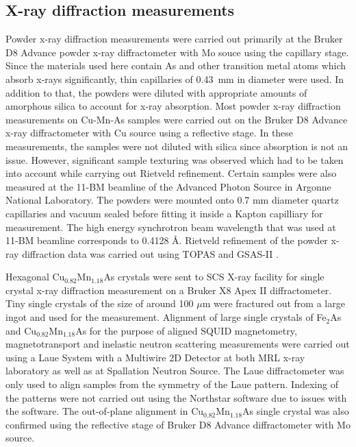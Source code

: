 \documentclass[10pt,doublespacing,edeposit]{uiucthesis2020}
\begin{document}
\begin{mainmatter}
\subsection{X-ray diffraction measurements}


Powder x-ray diffraction measurements were carried out primarily at the Bruker D8 Advance powder x-ray diffractometer with Mo souce using the capillary stage. Since the materials used here contain As and other transition metal atoms which absorb x-rays significantly, thin capillaries of 0.43~mm in diameter were used. In addition to that, the powders were diluted with appropriate amounts of amorphous silica to account for x-ray absorption. Most powder x-ray diffraction measurements on Cu-Mn-As samples were carried out on the Bruker D8 Advance x-ray diffractometer with Cu source using a reflective stage. In these measurements, the samples were not diluted with silica since absorption is not an issue. However, significant sample texturing was observed which had to be taken into account while carrying out Rietveld refinement. Certain samples were also measured at the 11-BM beamline of the Advanced Photon Source in Argonne National Laboratory. The powders were mounted onto 0.7 mm diameter quartz capillaries and vacuum sealed before fitting it inside a Kapton capilliary for measurement. The high energy synchrotron beam wavelength that was used at 11-BM beamline corresponds to 0.4128 \AA. Rietveld refinement of the powder x-ray diffraction data was carried out using \textsc{TOPAS} and \textsc{GSAS-II} \cite{Coelho:jo5037,Toby:aj5212}.

Hexagonal Cu$_{0.82}$Mn$_{1.18}$As crystals were sent to SCS X-ray facility for single crystal x-ray diffraction measurement on a Bruker X8 Apex II diffractometer. Tiny single crystals of the size of around 100 $\mu$m were fractured out from a large ingot and used for the measurement. Alignment of large single crystals of Fe$_2$As and Cu$_{0.82}$Mn$_{1.18}$As for the purpose of aligned SQUID magnetometry, magnetotransport and inelastic neutron scattering measurements were carried out using a Laue System with a Multiwire 2D Detector at both MRL x-ray laboratory as well as at Spallation Neutron Source. The Laue diffractometer was only used to align samples from the symmetry of the Laue pattern. Indexing of the patterns were not carried out using the Northstar software due to issues with the software. The out-of-plane alignment in Cu$_{0.82}$Mn$_{1.18}$As single crystal was also confirmed using the reflective stage of Bruker D8 Advance diffractometer with Mo source.


\end{mainmatter}
\end{document}
